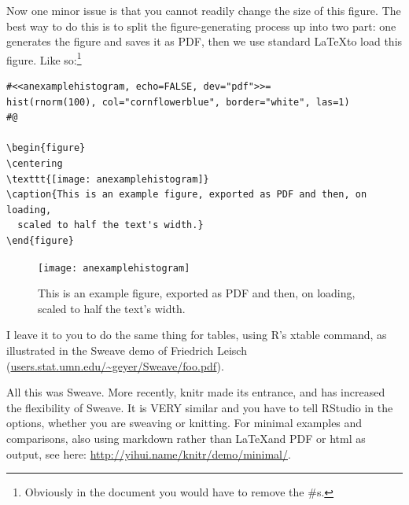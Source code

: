 \documentclass[11pt, a4paper]{article}\usepackage[]{graphicx}\usepackage[]{color}
\begin{document}
Now one minor issue is that you cannot readily change the size of this figure. The best way to do this is to split the figure-generating process up into two part: one generates the figure and saves it as PDF, then we use standard \LaTeX\/to load this figure. Like so:\footnote{Obviously in the document you would have to remove the \#s.}
\begin{verbatim}
#<<anexamplehistogram, echo=FALSE, dev="pdf">>=
hist(rnorm(100), col="cornflowerblue", border="white", las=1)
#@

\begin{figure}
\centering
\texttt{[image: anexamplehistogram]}
\caption{This is an example figure, exported as PDF and then, on loading, 
  scaled to half the text's width.}
\end{figure}
\end{verbatim}

\begin{figure}
\centering
\texttt{[image: anexamplehistogram]}
\captionsetup{width=0.8\textwidth}
\caption{This is an example figure, exported as PDF and then, on loading, scaled to half the text's width.}
\end{figure}


\medskip

I leave it to you to do the same thing for tables, using R's xtable command, as illustrated in the Sweave demo of Friedrich Leisch (\url{users.stat.umn.edu/~geyer/Sweave/foo.pdf}).


All this was Sweave. More recently, knitr made its entrance, and has increased the flexibility of Sweave. It is VERY similar and you have to tell RStudio in the options, whether you are sweaving or knitting. For minimal examples and comparisons, also using markdown rather than \LaTeX\/and PDF or html as output, see here: \url{http://yihui.name/knitr/demo/minimal/}.
\end{document}
